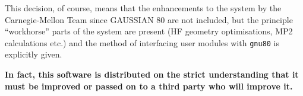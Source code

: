 This decision, of course, means that the enhancements to the
system 
by the Carnegie-Mellon Team 
since GAUSSIAN 80 are not included, but the principle
``workhorse'' parts of the system are present 
(HF geometry optimisations,
MP2 calculations etc.) and the method of interfacing user modules
with {\tt gnu80} is explicitly given.

\thispagestyle{plain}
{\bf In fact, this software is distributed on the strict understanding
that it  must be improved or passed on to a third party
who will improve it.
}


